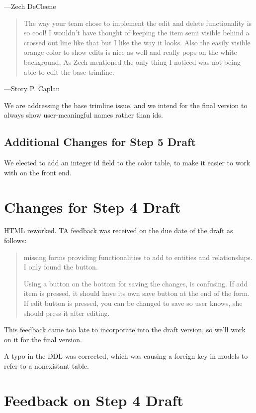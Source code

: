 \documentclass[11pt,letterpaper,oneside]{amsart}
\begin{document}
---Zech DeCleene

\begin{quotation}
The way your team chose to implement the edit and delete functionality is so cool! I wouldn't have thought of keeping the item semi visible behind a crossed out line like that but I like the way it looks. Also the easily visible orange color to show edits is nice as well and really pops on the white background. As Zech mentioned the only thing I noticed was not being able to edit the base trimline.
\end{quotation}

---Story P. Caplan

We are addressing the base trimline issue, and we intend for the final version to always show user-meaningful names rather than ids.

\subsection*{Additional Changes for Step 5 Draft}

We elected to add an integer id field to the color table, to make it easier to work with on the front end.


\section*{Changes for Step 4 Draft}

HTML reworked.  TA feedback was received on the due date of the draft as follows:

\begin{quotation}
missing forms providing functionalities to add to entities and relationships. I only found the button.

Using a button on the bottom for saving the changes, is confusing.  If add item is pressed, it should have its own save button at the end of the form. If edit button is pressed, you can be changed to save so user knows, she should press it after editing.

\end{quotation}

This feedback came too late to incorporate into the draft version, so we'll work on it for the final version.

A typo in the DDL was corrected, which was causing a foreign key in models to refer to a nonexistant table.


\section*{Feedback on Step 4 Draft}
\end{document}
